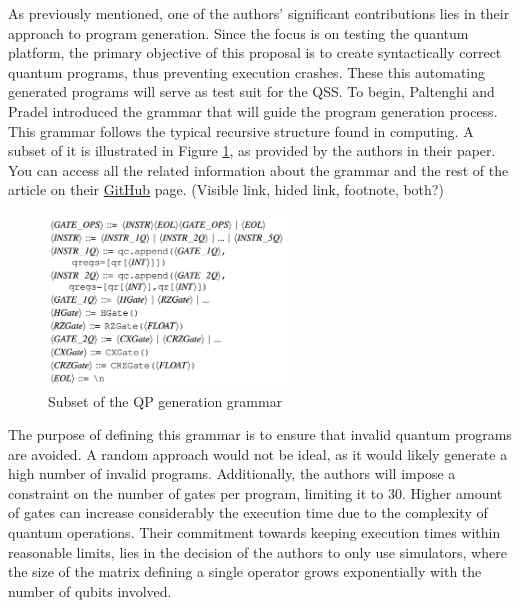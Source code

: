 \begin{itemize}
\vspace{-12pt}
As previously mentioned, one of the authors' significant contributions lies in their approach to program generation. Since the focus is on testing the quantum platform, the primary objective of this proposal is to create syntactically correct quantum programs, thus preventing execution crashes. These this automating generated programs will serve as test suit for the QSS. To begin, Paltenghi and Pradel introduced the grammar that will guide the program generation process. This grammar follows the typical recursive structure found in computing. A subset of it is illustrated in Figure \ref{Fig:MorphQGrammar}, as provided by the authors in their paper. You can access all the related information about the grammar and the rest of the article on their \hyperlink{https://github.com/sola-st/MorphQ-Quantum-Qiskit-Testing-ICSE-23}{GitHub} page. (Visible link, hided link, footnote, both?)

\vspace{-8pt}
\begin{figure}[H]
        \centering
        \includegraphics[width=0.56\textwidth]{TFM/photos/MorphQGrammar.png}
        \caption{Subset of the QP generation grammar \cite{paltenghi2023morphq}} 
        \label{Fig:MorphQGrammar}
\end{figure}

The purpose of defining this grammar is to ensure that invalid quantum programs are avoided. A random approach would not be ideal, as it would likely generate a high number of invalid programs. Additionally, the authors will impose a constraint on the number of gates per program, limiting it to 30. Higher amount of gates can increase considerably the execution time due to the complexity of quantum operations. Their commitment towards keeping execution times within reasonable limits, lies in the decision of the authors to only use simulators, where the size of the matrix defining a single operator grows exponentially with the number of qubits involved.\newline


\end{itemize}
